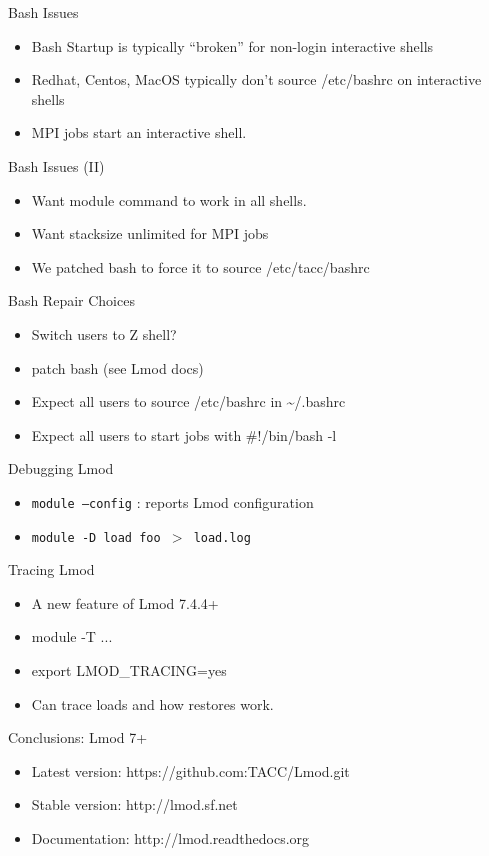 \documentclass{beamer}
\begin{document}
\begin{frame}{Bash Issues}
  \begin{itemize}
    \item Bash Startup is typically ``broken'' for non-login interactive shells
    \item Redhat, Centos, MacOS typically don't source /etc/bashrc on interactive shells
    \item MPI jobs start an interactive shell.
  \end{itemize}
\end{frame}

\begin{frame}{Bash Issues (II)}
  \begin{itemize}
    \item Want module command to work in all shells.
    \item Want stacksize unlimited for MPI jobs
    \item We patched bash to force it to source /etc/tacc/bashrc
  \end{itemize}
\end{frame}

\begin{frame}{Bash Repair Choices}
  \begin{itemize}
    \item Switch users to Z shell?
    \item patch bash (see Lmod docs)
    \item Expect all users to source /etc/bashrc in \textasciitilde/.bashrc
    \item Expect all users to start jobs with \#!/bin/bash -l
  \end{itemize}
\end{frame}

\begin{frame}{Debugging Lmod}
  \begin{itemize}
    \item \texttt{module --config} : reports Lmod configuration
    \item \texttt{module -D load foo $>$ load.log}
  \end{itemize}
\end{frame}

\begin{frame}{Tracing Lmod}
  \begin{itemize}
    \item A new feature of Lmod 7.4.4+
    \item module -T ...
    \item export LMOD\_TRACING=yes
    \item Can trace loads and how restores work.
  \end{itemize}
\end{frame}

\begin{frame}{Conclusions: Lmod 7+}
  \begin{itemize}
    \item Latest version: https://github.com:TACC/Lmod.git
    \item Stable version: http://lmod.sf.net
    \item Documentation:  http://lmod.readthedocs.org
  \end{itemize}
\end{frame}
\end{document}
